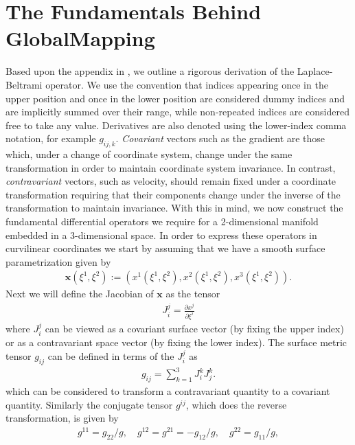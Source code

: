 %
\section{The Fundamentals Behind GlobalMapping}

Based upon the appendix in \cite{CantwellYKPS14}, we 
outline a rigorous derivation of the Laplace-Beltrami operator.
We use the convention that
indices appearing once in the upper position and once in the lower position are
considered dummy indices and are implicitly summed over their range, while
non-repeated indices are considered free to take any value. Derivatives are also
denoted using the lower-index comma notation, for example $g_{ij,k}$.
{\em Covariant} vectors such as the gradient are those which, under a change of
coordinate system, change under the same transformation in order to maintain
coordinate system invariance. In contrast, {\em contravariant} vectors, such as
velocity, should remain fixed under a coordinate transformation requiring that
their components change under the inverse of the transformation to maintain
invariance.
With this in mind, we now construct the fundamental differential operators we
require for a 2-dimensional manifold embedded in a 3-dimensional space.
In order to express these operators in curvilinear coordinates we start by
assuming that we have a smooth surface parametrization given by
\begin{align*}
	\mathbf{x}(\xi^1,\xi^2):=(x^1(\xi^1,\xi^2),x^2(\xi^1,\xi^2),x^3(\xi^1,\xi^2)).
\end{align*}
Next we will define the Jacobian of $\mathbf{x}$ as the tensor
\begin{align*}
        J_i^j = \frac{\partial x^j}{\partial \xi^i}
\end{align*}
where $J_i^j$ can be viewed as a covariant surface vector (by fixing the upper 
index) or as a contravariant space vector (by fixing the lower index). The
surface metric tensor $g_{ij}$ can be defined in terms of the $J_i^j$ as
\begin{align}
    g_{ij} = \sum_{k=1}^3 J_i^k J_j^k.
    \label{A:metric_tensor}
\end{align}
which can be considered to transform a contravariant quantity to a covariant 
quantity. Similarly the conjugate tensor $g^{ij}$, which does the reverse 
transformation, is given by
\begin{align}
    g^{11} = g_{22}/g,\quad g^{12} = g^{21} = - g_{12}/g,\quad g^{22} = g_{11}/g,
    \label{A:conj_tensor}
\end{align}
